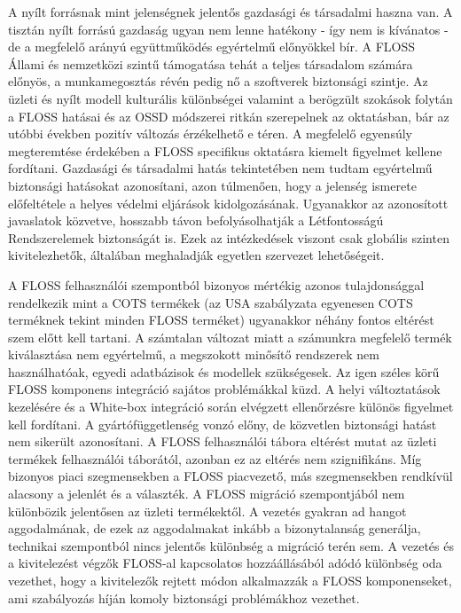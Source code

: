 \documentclass[12pt,magyar,a4paper,oneside]{scrreprt}
\begin{document}
A nyílt forrásnak mint jelenségnek jelentős gazdasági és társadalmi
haszna van. A tisztán nyílt forrású gazdaság ugyan nem lenne hatékony -
így nem is kívánatos - de a megfelelő arányú együttműködés egyértelmű
előnyökkel bír. A FLOSS Állami és nemzetközi szintű támogatása tehát a
teljes társadalom számára előnyös, a munkamegosztás révén pedig nő a
szoftverek biztonsági szintje. Az üzleti és nyílt modell kulturális
különbségei valamint a berögzült szokások folytán a FLOSS hatásai és az
OSSD módszerei ritkán szerepelnek az oktatásban, bár az utóbbi években
pozitív változás érzékelhető e téren. A megfelelő egyensúly megteremtése
érdekében a FLOSS specifikus oktatásra kiemelt figyelmet kellene
fordítani. Gazdasági és társadalmi hatás tekintetében nem tudtam
egyértelmű biztonsági hatásokat azonosítani, azon túlmenően, hogy a
jelenség ismerete előfeltétele a helyes védelmi eljárások
kidolgozásának. Ugyanakkor az azonosított javaslatok közvetve, hosszabb
távon befolyásolhatják a Létfontosságú Rendszerelemek biztonságát is.
Ezek az intézkedések viszont csak globális szinten kivitelezhetők,
általában meghaladják egyetlen szervezet lehetőségeit.

A FLOSS felhasználói szempontból bizonyos mértékig azonos tulajdonsággal
rendelkezik mint a COTS termékek (az USA szabályzata egyenesen COTS
terméknek tekint minden FLOSS terméket) ugyanakkor néhány fontos
eltérést szem előtt kell tartani. A számtalan változat miatt a számunkra
megfelelő termék kiválasztása nem egyértelmű, a megszokott minősítő
rendszerek nem használhatóak, egyedi adatbázisok és modellek
szükségesek. Az igen széles körű FLOSS komponens integráció sajátos
problémákkal küzd. A helyi változtatások kezelésére és a White-box
integráció során elvégzett ellenőrzésre különös figyelmet kell
fordítani. A gyártófüggetlenség vonzó előny, de közvetlen biztonsági
hatást nem sikerült azonosítani. A FLOSS felhasználói tábora eltérést
mutat az üzleti termékek felhasználói táborától, azonban ez az eltérés
nem szignifikáns. Míg bizonyos piaci szegmensekben a FLOSS piacvezető,
más szegmensekben rendkívül alacsony a jelenlét és a választék. A FLOSS
migráció szempontjából nem különbözik jelentősen az üzleti termékektől.
A vezetés gyakran ad hangot aggodalmának, de ezek az aggodalmakat inkább
a bizonytalanság generálja, technikai szempontból nincs jelentős
különbség a migráció terén sem. A vezetés és a kivitelezést végzők
FLOSS-al kapcsolatos hozzáállásából adódó különbség oda vezethet, hogy a
kivitelezők rejtett módon alkalmazzák a FLOSS komponenseket, ami
szabályozás híján komoly biztonsági problémákhoz vezethet.
\end{document}
